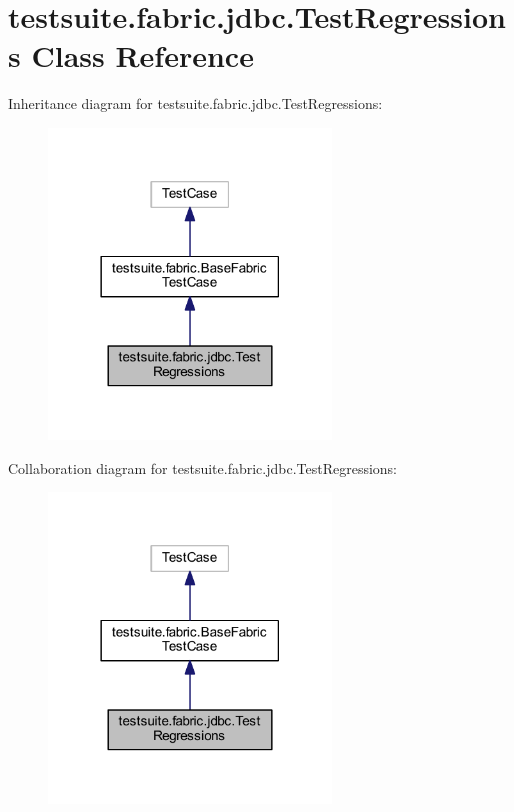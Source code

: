 \hypertarget{classtestsuite_1_1fabric_1_1jdbc_1_1_test_regressions}{}\section{testsuite.\+fabric.\+jdbc.\+Test\+Regressions Class Reference}
\label{classtestsuite_1_1fabric_1_1jdbc_1_1_test_regressions}


Inheritance diagram for testsuite.\+fabric.\+jdbc.\+Test\+Regressions\+:
\nopagebreak
\begin{figure}[H]
\begin{center}
\leavevmode
\includegraphics[width=213pt]{classtestsuite_1_1fabric_1_1jdbc_1_1_test_regressions__inherit__graph}
\end{center}
\end{figure}


Collaboration diagram for testsuite.\+fabric.\+jdbc.\+Test\+Regressions\+:
\nopagebreak
\begin{figure}[H]
\begin{center}
\leavevmode
\includegraphics[width=213pt]{classtestsuite_1_1fabric_1_1jdbc_1_1_test_regressions__coll__graph}
\end{center}
\end{figure}
